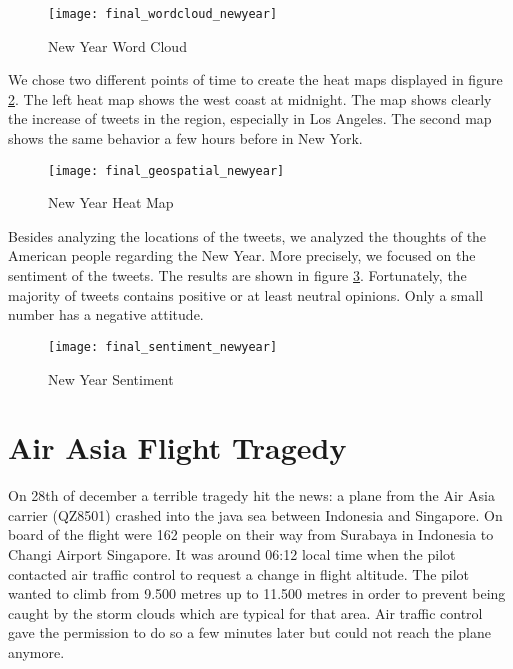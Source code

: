 \begin{figure}[H]
  \centering
        \texttt{[image: final\_wordcloud\_newyear]}
  \caption[New Year Word Cloud]{New Year Word Cloud}
  \label{fig:new-year-word-cloud}
  \vspace{-1.3em}
\end{figure}

We chose two different points of time to create the heat maps displayed in figure \ref{fig:new-year-heat-map}.
The left heat map shows the west coast at midnight. The map shows clearly the increase of tweets in the region, especially in Los Angeles. The second map shows the same behavior a few hours before in New York.

\begin{figure}[H]
  \centering
        \texttt{[image: final\_geospatial\_newyear]}
  \caption[New Year Heat Map]{New Year Heat Map}
  \label{fig:new-year-heat-map}
  \vspace{-1.3em}
\end{figure}

Besides analyzing the locations of the tweets, we analyzed the thoughts of the American people regarding the New Year. More precisely, we focused on the sentiment of the tweets. The results are shown in figure \ref{fig:new-year-sentiment}. Fortunately, the majority of tweets contains positive or at least neutral opinions. Only a small number has a negative attitude.

\begin{figure}[H]
  \centering
        \texttt{[image: final\_sentiment\_newyear]}
  \caption[New Year Sentiment]{New Year Sentiment}
  \label{fig:new-year-sentiment}
  \vspace{-1.3em}
\end{figure}


\section{Air Asia Flight Tragedy}
\label{sec:air-asia-flight-tragedy}

On 28th of december a terrible tragedy hit the news: a plane from the Air Asia carrier (QZ8501) crashed into the java sea between Indonesia and Singapore. On board of the flight were 162 people on their way from Surabaya in Indonesia to Changi Airport Singapore. It was around 06:12 local time when the pilot contacted air traffic control to request a change in flight altitude. The pilot wanted to  climb from 9.500 metres up to 11.500 metres in order to prevent being caught by the storm clouds which are typical for that area. Air traffic control gave the permission to do so a few minutes later but could not reach the plane anymore.\cite{bbc2014flight}

